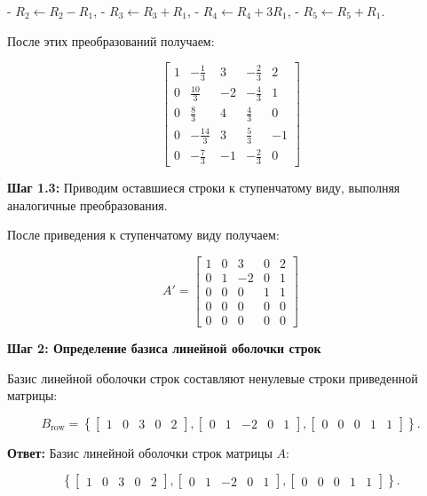 - \( R_2 \leftarrow R_2 - R_1 \),
- \( R_3 \leftarrow R_3 + R_1 \),
- \( R_4 \leftarrow R_4 + 3R_1 \),
- \( R_5 \leftarrow R_5 + R_1 \).

После этих преобразований получаем:

\[
\begin{bmatrix}
1 & -\frac{1}{3} & 3 & -\frac{2}{3} & 2 \\
0 & \frac{10}{3} & -2 & -\frac{4}{3} & 1 \\
0 & \frac{8}{3} & 4 & \frac{4}{3} & 0 \\
0 & -\frac{14}{3} & 3 & \frac{5}{3} & -1 \\
0 & -\frac{7}{3} & -1 & -\frac{2}{3} & 0
\end{bmatrix}
\]

\textbf{Шаг 1.3:} Приводим оставшиеся строки к ступенчатому виду, выполняя аналогичные преобразования.

После приведения к ступенчатому виду получаем:

\[
A' =
\begin{bmatrix}
1 & 0 & 3 & 0 & 2 \\
0 & 1 & -2 & 0 & 1 \\
0 & 0 & 0 & 1 & 1 \\
0 & 0 & 0 & 0 & 0 \\
0 & 0 & 0 & 0 & 0
\end{bmatrix}
\]

\textbf{Шаг 2: Определение базиса линейной оболочки строк}  

Базис линейной оболочки строк составляют ненулевые строки приведенной матрицы:

\[
B_{\text{row}} =
\left\{
\begin{bmatrix} 1 & 0 & 3 & 0 & 2 \end{bmatrix},
\begin{bmatrix} 0 & 1 & -2 & 0 & 1 \end{bmatrix},
\begin{bmatrix} 0 & 0 & 0 & 1 & 1 \end{bmatrix}
\right\}.
\]

\textbf{Ответ:}  
Базис линейной оболочки строк матрицы \( A \):

\[
\left\{
\begin{bmatrix} 1 & 0 & 3 & 0 & 2 \end{bmatrix},
\begin{bmatrix} 0 & 1 & -2 & 0 & 1 \end{bmatrix},
\begin{bmatrix} 0 & 0 & 0 & 1 & 1 \end{bmatrix}
\right\}.
\]

